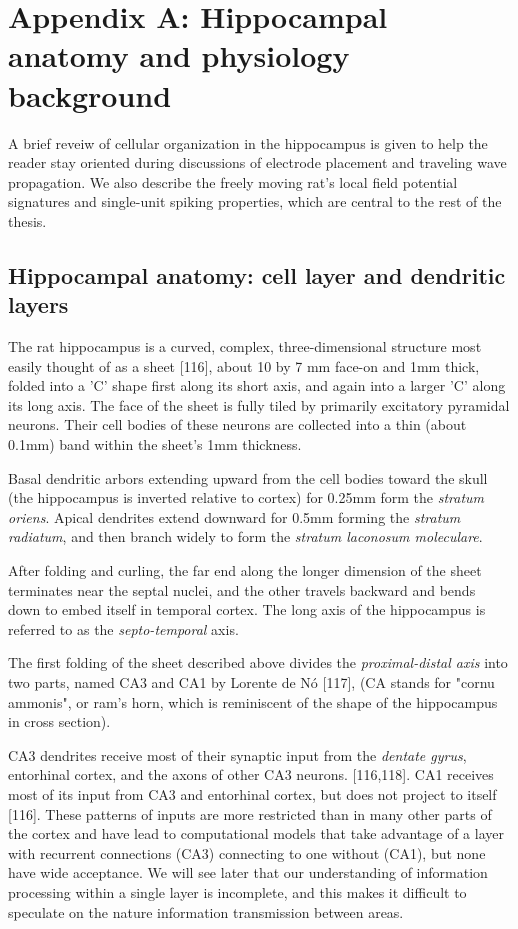 \documentclass[]{article}
\let\stdsection\section
\renewcommand\section{\newpage\stdsection}
\begin{document}
\section{Appendix A: Hippocampal anatomy and physiology background}

A brief reveiw of cellular organization in the hippocampus is given to
help the reader stay oriented during discussions of electrode placement
and traveling wave propagation. We also describe the freely moving rat's
local field potential signatures and single-unit spiking properties,
which are central to the rest of the thesis.

\subsection{Hippocampal anatomy: cell layer and dendritic layers}

The rat hippocampus is a curved, complex, three-dimensional structure
most easily thought of as a sheet {[}116{]}, about 10 by 7 mm face-on
and 1mm thick, folded into a 'C' shape first along its short axis, and
again into a larger 'C' along its long axis. The face of the sheet is
fully tiled by primarily excitatory pyramidal neurons. Their cell bodies
of these neurons are collected into a thin (about 0.1mm) band within the
sheet's 1mm thickness.

Basal dendritic arbors extending upward from the cell bodies toward the
skull (the hippocampus is inverted relative to cortex) for 0.25mm form
the \emph{stratum oriens}. Apical dendrites extend downward for 0.5mm
forming the \emph{stratum radiatum}, and then branch widely to form the
\emph{stratum laconosum moleculare}.

After folding and curling, the far end along the longer dimension of the
sheet terminates near the septal nuclei, and the other travels backward
and bends down to embed itself in temporal cortex. The long axis of the
hippocampus is referred to as the \emph{septo-temporal} axis.

The first folding of the sheet described above divides the
\emph{proximal-distal axis} into two parts, named CA3 and CA1 by Lorente
de Nó {[}117{]}, (CA stands for "cornu ammonis", or ram's horn, which is
reminiscent of the shape of the hippocampus in cross section).

CA3 dendrites receive most of their synaptic input from the
\emph{dentate gyrus}, entorhinal cortex, and the axons of other CA3
neurons. {[}116,118{]}. CA1 receives most of its input from CA3 and
entorhinal cortex, but does not project to itself {[}116{]}. These
patterns of inputs are more restricted than in many other parts of the
cortex and have lead to computational models that take advantage of a
layer with recurrent connections (CA3) connecting to one without (CA1),
but none have wide acceptance. We will see later that our understanding
of information processing within a single layer is incomplete, and this
makes it difficult to speculate on the nature information transmission
between areas.
\end{document}

